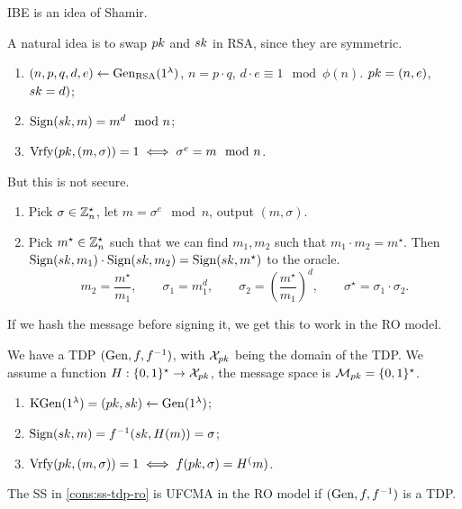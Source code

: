 \ac{IBE} is an idea of Shamir.

A natural idea is to swap $pk$ and $sk$ in \ac{RSA}, since they are symmetric.
\begin{enumerate}
	\item $(n, p, q, d, e) \leftarrow \mathrm{Gen}_{\mathrm{RSA}}(1^{\lambda})$, $n = p \cdot q$, $d \cdot e \equiv 1 \mod \phi(n)$.
		$pk = (n, e)$, $sk = d)$;
	\item $\mathrm{Sign}(sk, m) = m^d \mod n$;
	\item $\mathrm{Vrfy}(pk, (m, \sigma)) = 1 \iff \sigma^{e} = m \mod n$.
\end{enumerate}
But this is not secure.
\begin{enumerate}
	\item Pick $\sigma \in \mathbb{Z}_{n}^{\star}$, let $m = \sigma^e \mod n$, output $(m, \sigma)$.
	\item Pick $m^{\star} \in \mathbb{Z}_n^{\star}$ such that we can find $m_1, m_2$ such that $m_1 \cdot m_2 = m^{\star}$.
		Then $\mathrm{Sign}(sk, m_1) \cdot \mathrm{Sign}(sk, m_2) = \mathrm{Sign}(sk, m^{\star})$ to the oracle.
		\begin{equation*}
			m_2 = \frac{m^{\star}}{m_1},
			\qquad
			\sigma_1 = m_1^{d},
			\qquad
			\sigma_2 = \left( \frac{m^{\star}}{m_1} \right)^{d},
			\qquad
			\sigma^{\star} = \sigma_1 \cdot \sigma_2.
		\end{equation*}
\end{enumerate}

If we hash the message before signing it, we get this to work in the \ac{RO} model.

\begin{construction} \label{cons:ss-tdp-ro}
	We have a \ac{TDP} $(\mathrm{Gen}, f, f^{-1})$, with $\mathcal{X}_{pk}$ being the domain of the \ac{TDP}.
	We assume a function $H : \{0,1\}^{\star} \to \mathcal{X}_{pk}$, \ie the message space is $\mathcal{M}_{pk} = \{0,1\}^{\star}$.
	\begin{enumerate}
		\item $\mathrm{KGen}(1^{\lambda}) = (pk, sk) \leftarrow \mathrm{Gen}(1^{\lambda})$;
		\item $\mathrm{Sign}(sk, m) = f^{-1}(sk, H(m)) = \sigma$;
		\item $\mathrm{Vrfy}(pk, (m, \sigma)) = 1 \iff f(pk, \sigma) = H^(m)$. \qedhere
	\end{enumerate}
\end{construction}

\begin{theorem} \label{thm:ss-tdp-ro}
	The \ac{SS} in \cref{cons:ss-tdp-ro} is \ac{UFCMA} in the \ac{RO} model if $(\mathrm{Gen}, f, f^{-1})$ is a \ac{TDP}.
\end{theorem}

